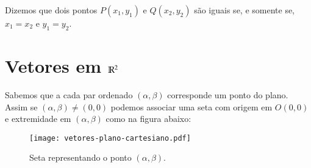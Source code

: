 Dizemos que dois pontos $P(x_1,y_1)$ e $Q(x_2,y_2)$ s\~ao iguais se, e somente se, $x_1 = x_2$ e $y_1 = y_2$.


\section{Vetores em $\mathbb{R}^2$} %
\label{sec:vetores_plano}



Sabemos que a cada par ordenado $(\alpha, \beta)$ corresponde um ponto do plano. Assim se $(\alpha, \beta) \ne (0,0)$ podemos associar uma seta com origem em $O(0,0)$ e extremidade em $(\alpha,\beta)$ como na figura abaixo:

\begin{figure}[!h]
	\centering
	\caption{Seta representando o ponto $(\alpha, \beta)$.}
	\texttt{[image: vetores-plano-cartesiano.pdf]}


\end{figure}

